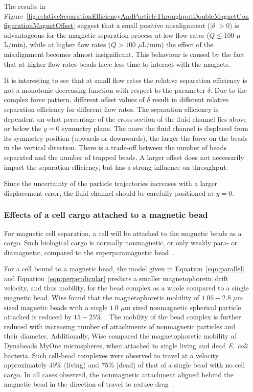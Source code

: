 The results in Figure~\ref{fig:relativeSeparationEfficiencyAndParticleThroughputDoubleMagnetConfigurationMagnetOffset} suggest that a small positive misalignment ($|\delta| > 0$) is advantageous for the magnetic separation process at low flow rates ($\dot{Q} \leq 100$ $\mu$L/min), while at higher flow rates ($\dot{Q} > 100$ $\mu$L/min) the effect of the misalignment becomes almost insignificant. This behaviour is caused by the fact that at higher flow rates beads have less time to interact with the magnets.

It is interesting to see that at small flow rates the relative separation efficiency is not a monotonic decreasing function with respect to the parameter $\delta$. Due to the complex force pattern, different offset values of $\delta$ result in different relative separation efficiency for different flow rates. The separation efficiency is dependent on what percentage of the cross-section of the fluid channel lies above or below the $y=0$ symmetry plane. The more the fluid channel is displaced from its symmetry position (upwards or downwards), the larger the force on the beads in the vertical direction. There is a trade-off between the number of beads separated and the number of trapped beads. A larger offset does not necessarily impact the separation efficiency, but has a strong influence on throughput.

Since the uncertainty of the particle trajectories increases with a larger displacement error, the fluid channel should be carefully positioned at $y=0$.

\subsubsection{Effects of a cell cargo attached to a magnetic bead}\label{subsec:effectsOfMagneticBeadCargo}
For magnetic cell separation, a cell will be attached to the magnetic beads as a cargo. Such biological cargo is normally nonmagnetic, or only weakly para- or diamagnetic, compared to the superparamagnetic bead~\cite{Takayasu2000,Yang1999,Zborowski2003red}. 

For a cell bound to a magnetic bead, the model given in Equation~\ref{eqn:parallel} and Equation~\ref{eqn:perpendicular} predicts a smaller magnetophoretic drift velocity, and thus mobility, for the bead complex as a whole compared to a single magnetic bead. Wise \etal{} found that the magnetophoretic mobility of $1.05-2.8$ $\mu$m sized magnetic beads with a single $1.0$ $\mu$m sized nonmagnetic spherical particle attached is reduced by $15-25\%$~\cite{WisePhD2015}. The mobility of the bead complex is further reduced with increasing number of attachments of nonmagnetic particles and their diameter. Additionally, Wise \etal{} compared the magnetophoretic mobility of Dynabeads MyOne microspheres, when attached to single living and dead \textit{E. coli} bacteria. Such cell-bead complexes were observed to travel at a velocity approximately $49\%$ (living) and $75\%$ (dead) of that of a single bead with no cell cargo. In all cases observed, the nonmagnetic attachment aligned behind the magnetic bead in the direction of travel to reduce drag~\cite{WisePhD2015}.

